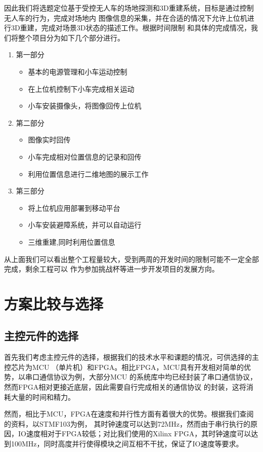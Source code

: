 \documentclass[UTF8,a4paper]{paper}
\begin{document}
因此我们将选题定位基于受控无人车的场地探测和3D重建系统，目标是通过控制无人车的行为，完成对场地内
图像信息的采集，并在合适的情况下允许上位机进行3D重建，完成对场景3D状态的描述工作。根据时间限制
和具体的完成情况，我们将整个项目分为如下几个部分进行。
\begin{enumerate}
    \item 第一部分
    \begin{itemize}
        \item 基本的电源管理和小车运动控制
        \item 在上位机控制下小车完成相关运动
        \item 小车安装摄像头，将图像回传上位机
    \end{itemize}
    \item 第二部分
    \begin{itemize}
        \item 图像实时回传
        \item 小车完成相对位置信息的记录和回传
        \item 利用位置信息进行二维地图的展示工作
    \end{itemize}
    \item 第三部分
    \begin{itemize}
        \item 将上位机应用部署到移动平台
        \item 小车安装避障系统，并可以自动运行
        \item 三维重建,同时利用位置信息
    \end{itemize}
\end{enumerate}
从上面我们可以看出整个工程量较大，受到两周的开发时间的限制可能不一定全部完成，剩余工程可以
作为参加挑战杯等进一步开发项目的发展方向。
                 
\section{方案比较与选择}
\subsection{主控元件的选择}
首先我们考虑主控元件的选择，根据我们的技术水平和课题的情况，可供选择的主控芯片为MCU
（单片机）和FPGA。相比FPGA，MCU具有开发相对简单的优势，以串口通信协议为例，大部分MCU
的系统库中均已经封装了串口通信协议，然而FPGA相对更接近底层，因此需要自行完成相关的通信协议
的封装，这将消耗大量的时间和精力。

然而，相比于MCU，FPGA在速度和并行性方面有着很大的优势。根据我们查阅的资料，以STMF103为例，
其时钟速度可以达到72MHz，然而由于串行执行的原因，IO速度相对于FPGA较低；对比我们使用的Xilinx
FPGA，其时钟速度可以达到100MHz，同时高度并行使得模块之间互相不干扰，保证了IO速度等要求。
\end{document}
